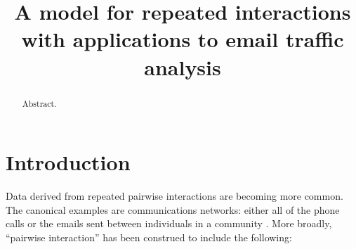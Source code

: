 \documentclass[aoas,preprint]{imsart}
\begin{document}
\begin{frontmatter}

\title{
    A model for repeated interactions with applications to email traffic
    analysis\protect{}
}



\begin{abstract}
Abstract.
\end{abstract}

\begin{keyword}[class=AMS]
\end{keyword}

\begin{keyword}
\end{keyword}

\end{frontmatter}


\section{Introduction}

Data derived from repeated pairwise interactions are becoming more common. 
The canonical examples are communications networks: either all of the phone
calls or the emails sent between individuals in a community
\cite{eagle2006reality,tyler2005email}. More broadly,
``pairwise interaction'' has been construed to include the following:
\end{document}
